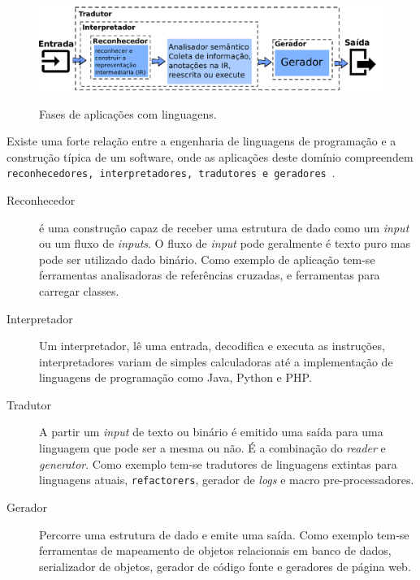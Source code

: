 \begin{figure}[h]
  \center
  \includegraphics[scale=0.9]{Imagens/stagesLanguageApp}
  \label{fig:stagesLanguageApp}
  \caption{Fases de aplicações com linguagens.}
\end{figure}

Existe uma forte relação entre a engenharia de linguagens de programação e a construção típica de um software, onde as aplicações deste domínio compreendem \texttt{reconhecedores, interpretadores, tradutores e geradores}~\cite{Parr:2009:LIP:1823613}. 

\begin{description}


\item[Reconhecedor] é uma construção capaz de receber uma estrutura de dado como um \textit{input} ou um fluxo de \textit{inputs}. O fluxo de \textit{input} pode geralmente é texto puro mas pode ser utilizado dado binário. Como exemplo de aplicação tem-se ferramentas analisadoras de referências cruzadas, e ferramentas para carregar classes.

\item[Interpretador] Um interpretador, lê uma entrada, decodifica e executa as instruções, interpretadores variam de simples calculadoras até a implementação de linguagens de programação como Java, Python e PHP.

\item[Tradutor]A partir um \textit{input} de texto ou binário é emitido uma saída para uma linguagem que pode ser a mesma ou não. É a combinação do \textit{reader} e \textit{generator}. Como exemplo tem-se tradutores de linguagens extintas para linguagens atuais, \texttt{refactorers},  gerador de \textit{logs} e macro pre-processadores.
	
\item[Gerador] Percorre uma estrutura de dado e emite uma saída. Como exemplo tem-se ferramentas de mapeamento de objetos relacionais em banco de dados, serializador de objetos, gerador de código fonte e geradores de página web.

\end{description}



